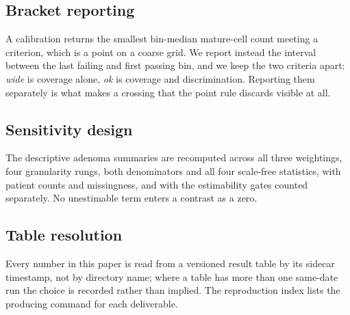 \subsection{Bracket reporting}
A calibration returns the smallest bin-median mature-cell count meeting a
criterion, which is a point on a coarse grid. We report instead the interval
between the last failing and first passing bin, and we keep the two criteria
apart: \emph{wide} is coverage alone, \emph{ok} is coverage and discrimination.
Reporting them separately is what makes a crossing that the point rule discards
visible at all.

\subsection{Sensitivity design}
The descriptive adenoma summaries are recomputed across all three weightings,
four granularity rungs, both denominators and all four scale-free statistics,
with patient counts and missingness, and with the estimability gates counted
separately. No unestimable term enters a contrast as a zero.

\subsection{Table resolution}
Every number in this paper is read from a versioned result table by its sidecar
timestamp, not by directory name; where a table has more than one same-date run
the choice is recorded rather than implied. The reproduction index lists the
producing command for each deliverable.

